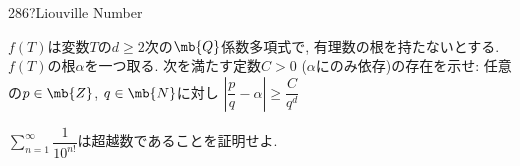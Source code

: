 \begin{prob}{286}{\hosi ?}{Liouville Number}
    \ben
    \item $f(T)$は変数$T$の$d\geq 2$次の$\mb{Q}$係数多項式で, 有理数の根を持たないとする. $f(T)$の根$\alpha$を一つ取る. 次を満たす定数$C>0$ ($\alpha$にのみ依存)の存在を示せ: 任意の$p\in \mb{Z}$, $q\in \mb{N}$に対し $\left|\dfrac{p}{q} - \alpha\right| \geq \dfrac{C}{q^d}$
    \item $\sum_{n=1}^{\infty} \dfrac{1}{10^{n!}}$は超越数であることを証明せよ. 
    \een 
\end{prob}
